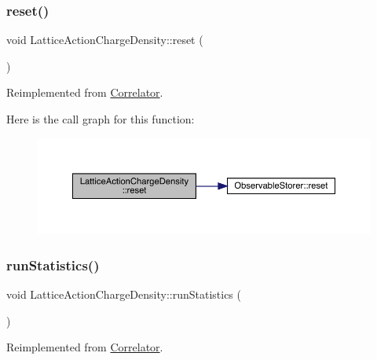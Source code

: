 \subsubsection{\texorpdfstring{reset()}{reset()}}
{\footnotesize\ttfamily void Lattice\+Action\+Charge\+Density\+::reset (\begin{DoxyParamCaption}{ }\end{DoxyParamCaption})\hspace{0.3cm}{\ttfamily [virtual]}}



Reimplemented from \mbox{\hyperlink{class_correlator_aacca40262d2cd62f0a3964e832f948c1}{Correlator}}.

Here is the call graph for this function\+:\nopagebreak
\begin{figure}[H]
\begin{center}
\leavevmode
\includegraphics[width=350pt]{class_lattice_action_charge_density_aebbc2cc72334e7b33d9cce2ad469280b_cgraph}
\end{center}
\end{figure}
\mbox{\label{class_lattice_action_charge_density_a21d608703811d2814e7f654588eaa0c0}} 
\subsubsection{\texorpdfstring{runStatistics()}{runStatistics()}}
{\footnotesize\ttfamily void Lattice\+Action\+Charge\+Density\+::run\+Statistics (\begin{DoxyParamCaption}{ }\end{DoxyParamCaption})\hspace{0.3cm}{\ttfamily [virtual]}}



Reimplemented from \mbox{\hyperlink{class_correlator_a35197b1d12b62ef30b79c0138a26456e}{Correlator}}.

